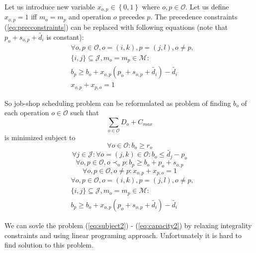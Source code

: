 \documentclass[a4paper,journal,twocolumn]{IEEEtran}
\begin{document}
Let us introduce new variable $x_{o,p}\in\left\{0,1\right\}$ where $o,p\in\mathcal{O}$. 
Let us define $x_{o,p} = 1 $ iff $m_o = m_p $ and operation $o$ precedes $p$.
The precedence constraints (\ref{eq:precconstraints}) can be replaced with following equations
(note that $p_o+s_{o,p} + \tilde{d_i}$ is constant):
\begin{align}
	& \forall o,p\in\mathcal{O},o=(i,k),p=(j,l),o\neq p, \nonumber \\
	& \{i,j\}\subseteq\mathcal{J}, m_o=m_p\in \mathcal{M}: \nonumber \\
	& b_p \ge b_o + x_{o,p}(p_o+s_{o,p} + \tilde{d_i}) - \tilde{d_i}\\
	&  x_{o,p}+x_{p,o} = 1
\end{align}

So job-shop scheduling problem can be reformulated as problem of finding $b_o$ of each operation
$o\in\mathcal{O}$ such that
\begin{equation}\label{eq:subject2}
	 \sum_{o\in\mathcal{O}}D_o + C_{max}
\end{equation}
is minimized subject to
\begin{equation}\label{eq:lowbound2}
	\forall o\in\mathcal{O}: b_o \ge r_o
\end{equation}
\begin{equation}\label{eq:upperbound2}
	\forall j \in \mathcal{J}: \forall o=(j,k)\in\mathcal{O}: b_o\le \tilde{d_j}-p_o
\end{equation}
\begin{equation}\label{eq:precconstraints2}
	\forall o,p \in\mathcal{O}, o\prec_o p:b_p \ge b_o+p_o+s_{o,p}
\end{equation}
\begin{equation}\label{eq:x}
\forall o,p\in\mathcal{O},o\neq p: x_{o,p}+x_{p,o} = 1
\end{equation}
\begin{align}\label{eq:capacity2}
	& \forall o,p\in\mathcal{O},o=(i,k),p=(j,l),o\neq p, \\
	& \{i,j\}\subseteq\mathcal{J}, m_o=m_p\in \mathcal{M}: \nonumber \\
	& b_p \ge b_o + x_{o,p}(p_o+s_{o,p} + \tilde{d_i}) - \tilde{d_i}\nonumber
\end{align}

We can sovle the problem (\ref{eq:subject2}) - (\ref{eq:capacity2}) by relaxing integrality constraints
and using linear programing approach. Unfortunately it is hard to find solution to this problem.
\end{document}
